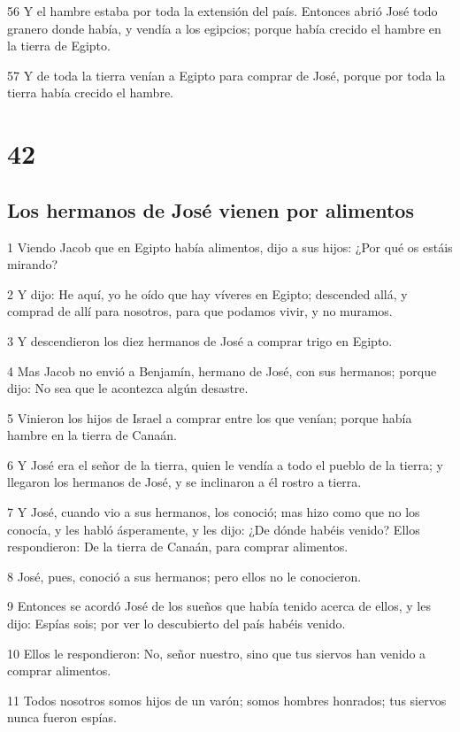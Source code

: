56 Y el hambre estaba por toda la extensión del país. Entonces abrió José todo granero donde había, y vendía a los egipcios; porque había crecido el hambre en la tierra de Egipto.

57 Y de toda la tierra venían a Egipto para comprar de José, porque por toda la tierra había crecido el hambre.

\chapter{42}

\section{Los hermanos de José vienen por alimentos}

1 Viendo Jacob que en Egipto había alimentos, dijo a sus hijos: ¿Por qué os estáis mirando?

2 Y dijo: He aquí, yo he oído que hay víveres en Egipto; descended allá, y comprad de allí para nosotros, para que podamos vivir, y no muramos.

3 Y descendieron los diez hermanos de José a comprar trigo en Egipto.

4 Mas Jacob no envió a Benjamín, hermano de José, con sus hermanos; porque dijo: No sea que le acontezca algún desastre.

5 Vinieron los hijos de Israel a comprar entre los que venían; porque había hambre en la tierra de Canaán.

6 Y José era el señor de la tierra, quien le vendía a todo el pueblo de la tierra; y llegaron los hermanos de José, y se inclinaron a él rostro a tierra.

7 Y José, cuando vio a sus hermanos, los conoció; mas hizo como que no los conocía, y les habló ásperamente, y les dijo: ¿De dónde habéis venido? Ellos respondieron: De la tierra de Canaán, para comprar alimentos.

8 José, pues, conoció a sus hermanos; pero ellos no le conocieron.

9 Entonces se acordó José de los sueños que había tenido acerca de ellos, y les dijo: Espías sois; por ver lo descubierto del país habéis venido.

10 Ellos le respondieron: No, señor nuestro, sino que tus siervos han venido a comprar alimentos.

11 Todos nosotros somos hijos de un varón; somos hombres honrados; tus siervos nunca fueron espías.


